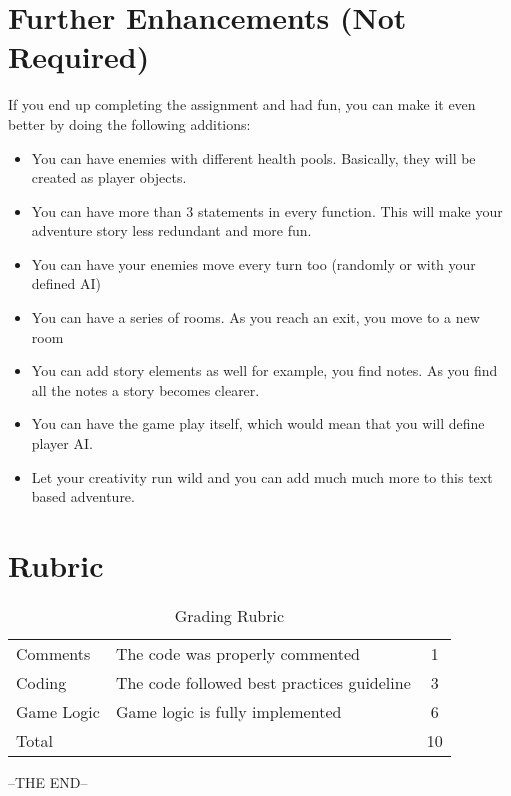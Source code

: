 \documentclass[a4paper,12pt]{article}
\begin{document}
	\section{Further Enhancements (Not Required)}
		If you end up completing the assignment and had fun, you can make it even better by doing the following additions:
	\begin{itemize}
		\item You can have enemies with different health pools. Basically, they will be created as player objects.
		\item You can have more than 3 statements in every function. This will make your adventure story less redundant and more fun.
		\item You can have your enemies move every turn too (randomly or with your defined AI)
		\item You can have a series of rooms. As you reach an exit, you move to a new room
		\item You can add story elements as well for example, you find notes. As you find all the notes a story becomes clearer.
		\item You can have the game play itself, which would mean that you will define player AI.
		\item Let your creativity run wild and you can add much much more to this text based adventure.
	\end{itemize}
	
		\section{Rubric}
	\begin{table}[h]
		\centering
		\begin{tabular}{llc}
			\toprule
			Comments &	The code was properly commented	& 1 \\
			Coding	& The code followed best practices guideline &	3 \\
			Game Logic	& Game logic is fully implemented	& 6 \\
			\midrule
			Total & & 10\\
			\bottomrule
		\end{tabular}
		\caption{Grading Rubric}
		\label{Grading}
	\end{table}

	\begin{center}
		--THE END--
	\end{center}
	
\end{document}
